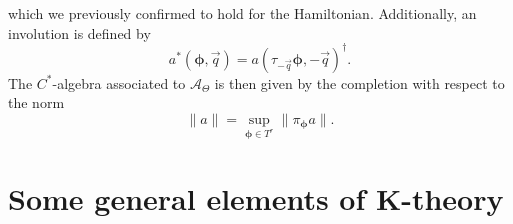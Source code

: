 \documentclass[
    10pt,
    aps,
    prb,
    twocolumn,
    floatfix,
    superscriptaddress,
]{revtex4-2}
\begin{document}
which we previously confirmed to hold for the Hamiltonian.
Additionally, an involution is defined by
\begin{equation}
	a^\ast( \boldsymbol{\phi}, \vec{q})
	= a( \tau_{-\vec{q}} \boldsymbol{\phi}, -\vec{q})^\dagger .
\end{equation}
The $C^\ast$-algebra associated to $\mathcal{A}_{\Theta}$ is then given by the completion with respect to the norm 
\begin{equation}
	\| a \| = \sup\limits_{ \boldsymbol{\phi} \in T^r} \| \pi_{\boldsymbol{\phi}} a \| .
\end{equation}

\section{Some general elements of K-theory}
\label{app:k_theory}
\end{document}

